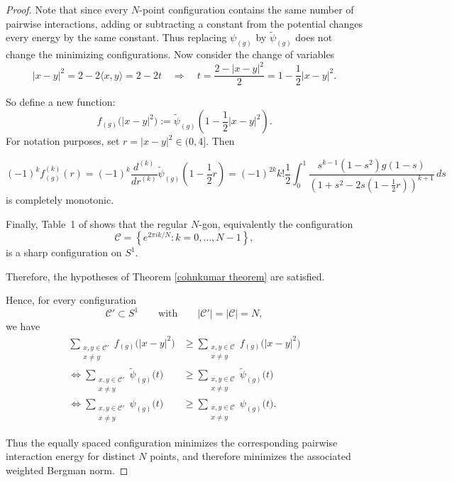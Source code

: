 \documentclass{article}
\begin{document}
\begin{proof}
Note that since every $N$-point configuration contains the same number of pairwise interactions, adding or subtracting a constant from the potential changes every energy by the same constant. Thus replacing $\psi_{(g)}$ by $\widetilde{\psi}_{(g)}$ does not change the minimizing configurations. Now consider the change of variables 
\[
|x-y|^2=2-2\langle x,y\rangle=2-2t
\quad\Longrightarrow\quad
t=\frac{2-|x-y|^2}{2}=1-\frac{1}{2}|x-y|^2.
\]

So define a new function:
\[
f_{(g)}\bigl(|x-y|^2\bigr)
:=\widetilde{\psi}_{(g)}\left(1-\frac12|x-y|^2\right).
\]
For notation purposes, set $r=|x-y|^2 \in (0,4].$
Then

\[(-1)^kf_{(g)}^{(k)}(r)=(-1)^k \frac{d^{(k)}}{dr^{(k)}}\widetilde{\psi}_{(g)} \left(1-\frac{1}{2}r \right)= (-1)^{2k}k!\frac12
\int_0^1
\frac{s^{k-1}(1-s^2)g(1-s)}{\left(1+s^2-2s(1-\frac12r)\right)^{k+1}}\,ds\]
is completely monotonic.

Finally, Table~1 of \cite{cohnKumar2007} shows that the regular $N$-gon, equivalently the configuration
\[\mathcal{C}=\left\{e^{2\pi i k/N}:k=0,\dots,N-1\right\},\]
is a sharp configuration on $S^1$.

Therefore, the hypotheses of Theorem \ref{cohnkumar theorem} are satisfied.

Hence, for every configuration
\[
\mathcal{C}'\subset S^1
\qquad\text{with}\qquad
|\mathcal{C}'|=|\mathcal{C}|=N,
\]
we have
\begin{align*}
    \sum_{\substack{x,y\in\mathcal{C}'\\x\neq y}}
f_{(g)}\bigl(|x-y|^2\bigr)
&\geq
\sum_{\substack{x,y\in\mathcal{C}\\x\neq y}}
f_{(g)}\bigl(|x-y|^2\bigr)\\
\iff \sum_{\substack{x,y\in\mathcal{C}'\\x\neq y}}
\widetilde{\psi}_{(g)}\bigl(t\bigr)
&\geq
\sum_{\substack{x,y\in\mathcal{C}\\x\neq y}}
\widetilde{\psi}_{(g)}\bigl(t\bigr)\\
\iff \sum_{\substack{x,y\in\mathcal{C}'\\x\neq y}}
\psi_{(g)}\bigl(t\bigr)
&\geq
\sum_{\substack{x,y\in\mathcal{C}\\x\neq y}}
\psi_{(g)}\bigl(t\bigr).
\end{align*}

Thus the equally spaced configuration minimizes the corresponding pairwise interaction energy for distinct $N$ points, and therefore minimizes the associated weighted Bergman norm.


\end{proof}
\end{document}
